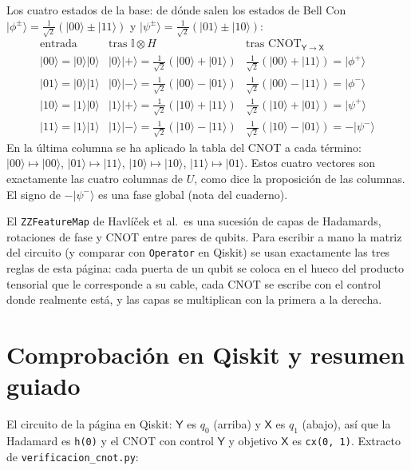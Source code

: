 \documentclass[11pt, a4paper, twoside, openright]{report}
\newenvironment{bloque}{\par\noindent\begin{minipage}{\linewidth}\setlength{\parskip}{4pt}}{\end{minipage}\par\medskip}
\providecommand{\ket}[1]{|#1\rangle}
\newcommand{\X}{\mathsf{X}}
\newcommand{\Y}{\mathsf{Y}}
\newcommand{\CYX}{\mathrm{CNOT}_{\Y\to\X}}
\newcommand{\I}{\mathbb{I}}
\newcommand{\rdos}{\tfrac{1}{\sqrt2}}
\begin{document}
\begin{ejemplo}{Los cuatro estados de la base: de dónde salen los estados de Bell}
Con $\ket{\phi^\pm}=\rdos(\ket{00}\pm\ket{11})$ y $\ket{\psi^\pm}=\rdos(\ket{01}\pm\ket{10})$:
\[
\renewcommand{\arraystretch}{1.5}
\begin{array}{c|c|c}
\text{entrada} & \text{tras } \I\otimes H & \text{tras } \CYX\\ \hline
\ket{00}=\ket0\ket0 & \ket0\ket+=\rdos(\ket{00}+\ket{01}) & \rdos(\ket{00}+\ket{11})=\ket{\phi^+}\\
\ket{01}=\ket0\ket1 & \ket0\ket-=\rdos(\ket{00}-\ket{01}) & \rdos(\ket{00}-\ket{11})=\ket{\phi^-}\\
\ket{10}=\ket1\ket0 & \ket1\ket+=\rdos(\ket{10}+\ket{11}) & \rdos(\ket{10}+\ket{01})=\ket{\psi^+}\\
\ket{11}=\ket1\ket1 & \ket1\ket-=\rdos(\ket{10}-\ket{11}) & \rdos(\ket{10}-\ket{01})=-\ket{\psi^-}
\end{array}
\]
En la última columna se ha aplicado la tabla del CNOT a cada término: $\ket{00}\mapsto\ket{00}$, $\ket{01}\mapsto\ket{11}$, $\ket{10}\mapsto\ket{10}$, $\ket{11}\mapsto\ket{01}$. Estos cuatro vectores son exactamente las cuatro columnas de $U$, como dice la proposición de las columnas. El signo de $-\ket{\psi^-}$ es una fase global (nota del cuaderno).
\end{ejemplo}

\begin{tfg}
El \texttt{ZZFeatureMap} de Havlíček et al.\ es una sucesión de capas de Hadamards, rotaciones de fase y CNOT entre pares de qubits. Para escribir a mano la matriz del circuito (y comparar con \texttt{Operator} en Qiskit) se usan exactamente las tres reglas de esta página: cada puerta de un qubit se coloca en el hueco del producto tensorial que le corresponde a su cable, cada CNOT se escribe con el control donde realmente está, y las capas se multiplican con la primera a la derecha.
\end{tfg}

\cleardoublepage
\section{Comprobación en Qiskit y resumen guiado}\label{sec:resumen}

\begin{bloque}
El circuito de la página en Qiskit: $\Y$ es $q_0$ (arriba) y $\X$ es $q_1$ (abajo), así que la Hadamard es \texttt{h(0)} y el CNOT con control $\Y$ y objetivo $\X$ es \texttt{cx(0, 1)}. Extracto de \texttt{verificacion\_cnot.py}:
\end{bloque}
\end{document}
